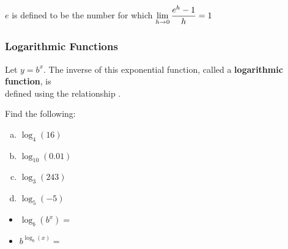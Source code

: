 \documentclass[notes]{subfiles}
\begin{document}
		\begin{defn}
			\(e\) is defined to be the number for which \(\displaystyle \lim_{h\to 0} \dfrac{e^h-1}{h} = 1\)
		\end{defn}
	
	\subsubsection*{Logarithmic Functions}
		\begin{defn}
			Let \(y = b^x\).  The inverse of this exponential function, called a \textbf{logarithmic function}, is\\[20pt] defined using the relationship .
		\end{defn}
		
		\begin{ex}
			Find the following:
			\begin{enumerate}[(a)]
				\item \(\log_4(16)\)
					
				\item \(\log_{10} (0.01)\)
					
				\item \(\log_3 (243)\)
					
				\item \(\log_5 (-5)\)
			\end{enumerate}
		\end{ex}
	
		\begin{rmk}
			\begin{itemize}
				\setlength\itemsep{30pt}
				\item \(\log_b (b^x) =\) 
				\item \(b^{\log_b(x)} = \) 
			\end{itemize}
		\end{rmk}
			\newpage
			
\end{document}

